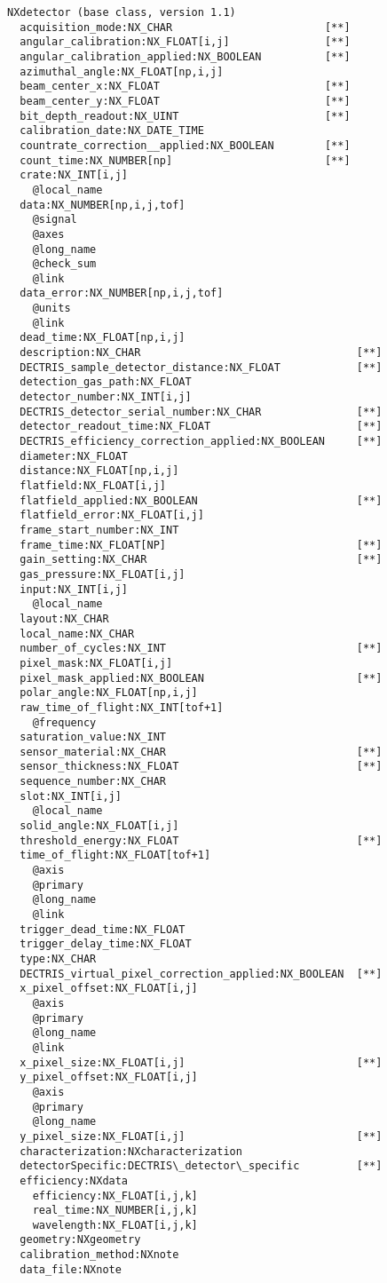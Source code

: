 \documentclass[11pt]{article}
\begin{document}
{{ 
\begin{verbatim}
NXdetector (base class, version 1.1)
  acquisition_mode:NX_CHAR                        [**]
  angular_calibration:NX_FLOAT[i,j]               [**]
  angular_calibration_applied:NX_BOOLEAN          [**]
  azimuthal_angle:NX_FLOAT[np,i,j]
  beam_center_x:NX_FLOAT                          [**]
  beam_center_y:NX_FLOAT                          [**]
  bit_depth_readout:NX_UINT                       [**]
  calibration_date:NX_DATE_TIME
  countrate_correction__applied:NX_BOOLEAN        [**]
  count_time:NX_NUMBER[np]                        [**]
  crate:NX_INT[i,j] 
    @local_name
  data:NX_NUMBER[np,i,j,tof]
    @signal
    @axes
    @long_name
    @check_sum
    @link
  data_error:NX_NUMBER[np,i,j,tof]
    @units
    @link
  dead_time:NX_FLOAT[np,i,j]
  description:NX_CHAR                                  [**]
  DECTRIS_sample_detector_distance:NX_FLOAT            [**]
  detection_gas_path:NX_FLOAT
  detector_number:NX_INT[i,j]
  DECTRIS_detector_serial_number:NX_CHAR               [**]
  detector_readout_time:NX_FLOAT                       [**]
  DECTRIS_efficiency_correction_applied:NX_BOOLEAN     [**]
  diameter:NX_FLOAT
  distance:NX_FLOAT[np,i,j]
  flatfield:NX_FLOAT[i,j]
  flatfield_applied:NX_BOOLEAN                         [**]
  flatfield_error:NX_FLOAT[i,j]
  frame_start_number:NX_INT
  frame_time:NX_FLOAT[NP]                              [**]
  gain_setting:NX_CHAR                                 [**]
  gas_pressure:NX_FLOAT[i,j]
  input:NX_INT[i,j]
    @local_name
  layout:NX_CHAR
  local_name:NX_CHAR
  number_of_cycles:NX_INT                              [**]
  pixel_mask:NX_FLOAT[i,j]
  pixel_mask_applied:NX_BOOLEAN                        [**]
  polar_angle:NX_FLOAT[np,i,j]
  raw_time_of_flight:NX_INT[tof+1]
    @frequency
  saturation_value:NX_INT
  sensor_material:NX_CHAR                              [**]
  sensor_thickness:NX_FLOAT                            [**]
  sequence_number:NX_CHAR
  slot:NX_INT[i,j]
    @local_name
  solid_angle:NX_FLOAT[i,j]
  threshold_energy:NX_FLOAT                            [**]
  time_of_flight:NX_FLOAT[tof+1]
    @axis
    @primary
    @long_name
    @link
  trigger_dead_time:NX_FLOAT
  trigger_delay_time:NX_FLOAT
  type:NX_CHAR
  DECTRIS_virtual_pixel_correction_applied:NX_BOOLEAN  [**]
  x_pixel_offset:NX_FLOAT[i,j]
    @axis
    @primary
    @long_name
    @link
  x_pixel_size:NX_FLOAT[i,j]                           [**]
  y_pixel_offset:NX_FLOAT[i,j]
    @axis
    @primary
    @long_name
  y_pixel_size:NX_FLOAT[i,j]                           [**]
  characterization:NXcharacterization
  detectorSpecific:DECTRIS\_detector\_specific         [**]
  efficiency:NXdata
    efficiency:NX_FLOAT[i,j,k]
    real_time:NX_NUMBER[i,j,k]
    wavelength:NX_FLOAT[i,j,k]
  geometry:NXgeometry
  calibration_method:NXnote
  data_file:NXnote
\end{verbatim}


}}
\end{document}
